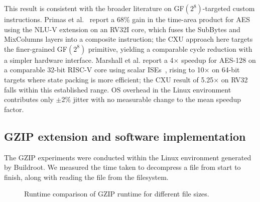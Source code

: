 This result is consistent with the broader literature on GF$(2^8)$-targeted custom
instructions.
Primas et al.~\cite{Primas2024NLUV} report a 68\% gain in the time-area product for
AES using the NLU-V extension on an RV32I core, which fuses the SubBytes and
MixColumns layers into a composite instruction; the CXU approach here targets the
finer-grained GF$(2^8)$ primitive, yielding a comparable cycle reduction with a
simpler hardware interface.
Marshall et al. report a 4$\times$ speedup for AES-128 on a comparable 32-bit
RISC-V core using scalar ISEs~\cite{Marshall2020AES}, rising to 10$\times$ on 64-bit
targets where state packing is more efficient; the CXU result of 5.25$\times$ on RV32
falls within this established range.
OS overhead in the Linux environment contributes only $\pm$2\% jitter with no
measurable change to the mean speedup factor.

\subsection{GZIP extension and software implementation}
\label{subsec:gzip_results}
The GZIP experiments were conducted within the Linux environment generated by Buildroot.
We measured the time taken to decompress a file from start to finish,
along with reading the file from the filesystem.

\begin{figure}[htb]
\centering
{}
\caption{Runtime comparison of GZIP runtime for different file sizes.}
\label{fig:gzip_runtime}
\end{figure}

